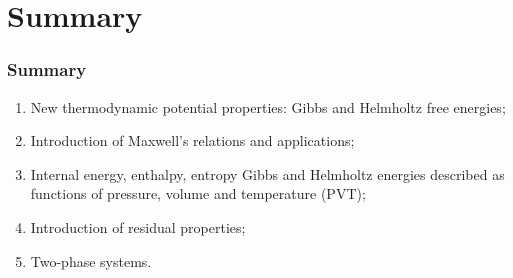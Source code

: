 \documentclass[10pt,compress,unknownkeysallowed]{beamer}
\begin{document}

\section{Summary}

\begin{frame}
 \frametitle{Summary}
   \begin{enumerate}[1.]
     \item New thermodynamic potential properties: Gibbs and Helmholtz free energies;
     \item Introduction of Maxwell's relations and applications;
     \item Internal energy, enthalpy, entropy Gibbs and Helmholtz energies described as functions of pressure, volume and temperature (PVT);
     \item Introduction of residual properties;
     \item Two-phase systems.
   \end{enumerate}
\end{frame}
\end{document}
